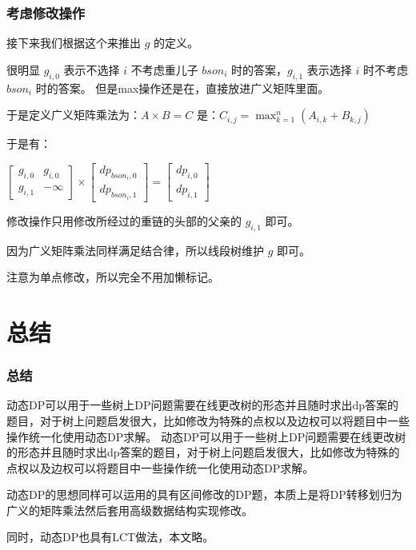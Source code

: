 \documentclass[UTF8]{ctexbeamer}
\begin{document}
	\begin{frame}
		\frametitle{考虑修改操作}
			接下来我们根据这个来推出 $g$ 的定义。
		
		很明显 $g_{i,0}$ 表示不选择 $i$ 不考虑重儿子 $bson_i$ 时的答案，$g_{i,1}$ 表示选择 $i$ 时不考虑 $bson_i$ 时的答案。
		但是max操作还是在，直接放进广义矩阵里面。
		
		于是定义广义矩阵乘法为：$A \times B=C$ 是：$C_{i,j}=\max_{k=1}^{n}(A_{i,k}+ B_{k,j})$
		
		于是有：
		
		$\begin{bmatrix}g_{i,0}&g_{i,0} \\g_{i,1}& -\infty \end{bmatrix} \times \begin{bmatrix} dp_{bson_i,0} \\ dp_{bson_i,1}\end{bmatrix} = \begin{bmatrix}dp_{i,0} \\dp_{i,1} \end{bmatrix}$
		
		修改操作只用修改所经过的重链的头部的父亲的 $g_{i,1}$ 即可。
		
		因为广义矩阵乘法同样满足结合律，所以线段树维护 $g$ 即可。
		
		注意为单点修改，所以完全不用加懒标记。
	\end{frame}
\section{总结}
	\begin{frame}
		\frametitle{总结}
		动态DP可以用于一些树上DP问题需要在线更改树的形态并且随时求出dp答案的题目，对于树上问题启发很大，比如修改为特殊的点权以及边权可以将题目中一些操作统一化使用动态DP求解。
		动态DP可以用于一些树上DP问题需要在线更改树的形态并且随时求出dp答案的题目，对于树上问题启发很大，比如修改为特殊的点权以及边权可以将题目中一些操作统一化使用动态DP求解。
		
		\hspace*{\fill}
		
		动态DP的思想同样可以运用的具有区间修改的DP题，本质上是将DP转移划归为广义的矩阵乘法然后套用高级数据结构实现修改。
		
		\hspace*{\fill}
		
		同时，动态DP也具有LCT做法，本文略。
	\end{frame}
\end{document}
